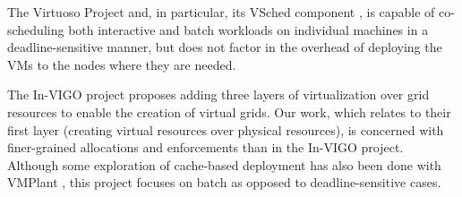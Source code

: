 The Virtuoso Project \cite{BorjaCite19} and, in particular, its VSched component \cite{BorjaCite17},
is capable of co{}-scheduling both interactive and batch workloads on
individual machines in a deadline{}-sensitive manner, but does not
factor in the overhead of deploying the VMs to the nodes where they are
needed.

The In{}-VIGO project \cite{BorjaCite16} proposes adding three layers of
virtualization over grid resources to enable the creation of virtual
grids. Our work, which relates to their first layer (creating virtual
resources over physical resources), is concerned with finer{}-grained
allocations and enforcements than in the In{}-VIGO project. Although some exploration of cache-based deployment has also been done with VMPlant \cite{BorjaCite20}, this project focuses on batch as opposed to deadline-sensitive cases.


